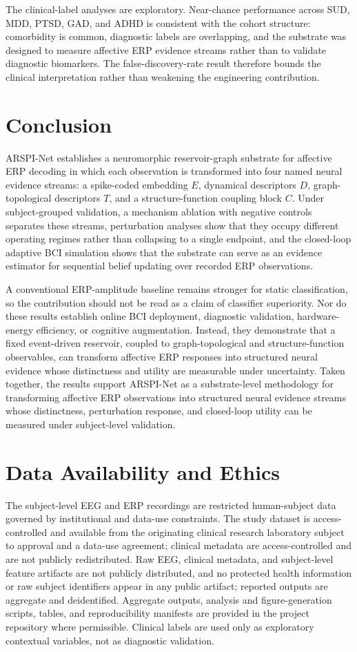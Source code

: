 \documentclass[journal]{IEEEtran}
\begin{document}
The clinical-label analyses are exploratory. Near-chance performance across SUD, MDD, PTSD, GAD, and ADHD is consistent with the cohort structure: comorbidity is common, diagnostic labels are overlapping, and the substrate was designed to measure affective ERP evidence streams rather than to validate diagnostic biomarkers. The false-discovery-rate result therefore bounds the clinical interpretation rather than weakening the engineering contribution.

\section{Conclusion}
ARSPI-Net establishes a neuromorphic reservoir-graph substrate for affective ERP decoding in which each observation is transformed into four named neural evidence streams: a spike-coded embedding $E$, dynamical descriptors $D$, graph-topological descriptors $T$, and a structure-function coupling block $C$. Under subject-grouped validation, a mechanism ablation with negative controls separates these streams, perturbation analyses show that they occupy different operating regimes rather than collapsing to a single endpoint, and the closed-loop adaptive BCI simulation shows that the substrate can serve as an evidence estimator for sequential belief updating over recorded ERP observations.

A conventional ERP-amplitude baseline remains stronger for static classification, so the contribution should not be read as a claim of classifier superiority. Nor do these results establish online BCI deployment, diagnostic validation, hardware-energy efficiency, or cognitive augmentation. Instead, they demonstrate that a fixed event-driven reservoir, coupled to graph-topological and structure-function observables, can transform affective ERP responses into structured neural evidence whose distinctness and utility are measurable under uncertainty. Taken together, the results support ARSPI-Net as a substrate-level methodology for transforming affective ERP observations into structured neural evidence streams whose distinctness, perturbation response, and closed-loop utility can be measured under subject-level validation.

\section*{Data Availability and Ethics}
The subject-level EEG and ERP recordings are restricted human-subject data governed by institutional and data-use constraints. The study dataset is access-controlled and available from the originating clinical research laboratory subject to approval and a data-use agreement; clinical metadata are access-controlled and are not publicly redistributed. Raw EEG, clinical metadata, and subject-level feature artifacts are not publicly distributed, and no protected health information or raw subject identifiers appear in any public artifact; reported outputs are aggregate and deidentified. Aggregate outputs, analysis and figure-generation scripts, tables, and reproducibility manifests are provided in the project repository where permissible. Clinical labels are used only as exploratory contextual variables, not as diagnostic validation.
\end{document}
